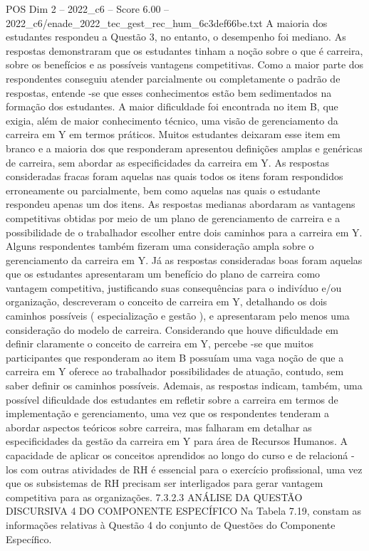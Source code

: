 \begin{textsample}{POS Dim 2 – 2022\_c6 – Score 6.00 – 2022\_c6/enade\_2022\_tec\_gest\_rec\_hum\_6c3def66be.txt}
A maioria dos estudantes respondeu a Questão 3, no entanto, o desempenho foi mediano.
As respostas demonstraram que os estudantes tinham a noção sobre o que é carreira, sobre os benefícios e as possíveis vantagens competitivas.
Como a maior parte dos respondentes conseguiu atender parcialmente ou completamente o padrão de respostas, entende -se que esses conhecimentos estão bem sedimentados na formação dos estudantes.
A maior dificuldade foi encontrada no item B, que exigia, além de maior conhecimento técnico, uma visão de gerenciamento da carreira em Y em termos práticos.
Muitos estudantes deixaram esse item em branco e a maioria dos que responderam apresentou definições amplas e genéricas de carreira, sem abordar as especificidades da carreira em Y.
As respostas consideradas fracas foram aquelas nas quais todos os itens foram respondidos erroneamente ou parcialmente, bem como aquelas nas quais o estudante respondeu apenas um dos itens.
As respostas medianas abordaram as vantagens competitivas obtidas por meio de um plano de gerenciamento de carreira e a possibilidade de o trabalhador escolher entre dois caminhos para a carreira em Y.
Alguns respondentes também fizeram uma consideração ampla sobre o gerenciamento da carreira em Y.
Já as respostas consideradas boas foram aquelas que os estudantes apresentaram um benefício do plano de carreira como vantagem competitiva, justificando suas consequências para o indivíduo e/ou organização, descreveram o conceito de carreira em Y, detalhando os dois caminhos possíveis ( especialização e gestão ), e apresentaram pelo menos uma consideração do modelo de carreira.
Considerando que houve dificuldade em definir claramente o conceito de carreira em Y, percebe -se que muitos participantes que responderam ao item B possuíam uma vaga noção de que a carreira em Y oferece ao trabalhador possibilidades de atuação, contudo, sem saber definir os caminhos possíveis.
Ademais, as respostas indicam, também, uma possível dificuldade dos estudantes em refletir sobre a carreira em termos de implementação e gerenciamento, uma vez que os respondentes tenderam a abordar aspectos teóricos sobre carreira, mas falharam em detalhar as especificidades da gestão da carreira em Y para área de Recursos Humanos.
A capacidade de aplicar os conceitos aprendidos ao longo do curso e de relacioná -los com outras atividades de RH é essencial para o exercício profissional, uma vez que os subsistemas de RH precisam ser interligados para gerar vantagem competitiva para as organizações. 7.3.2.3 ANÁLISE DA QUESTÃO DISCURSIVA 4 DO COMPONENTE ESPECÍFICO Na Tabela 7.19, constam as informações relativas à Questão 4 do conjunto de Questões do Componente Específico.

\end{textsample}
